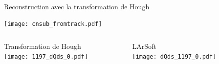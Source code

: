    \begin{frame}{Reconstruction avec la transformation de Hough}
        \begin{scriptsize}
            \begin{center} \texttt{[image: cnsub\_fromtrack.pdf]} \end{center}
            \begin{columns}
                \begin{column}{0.6\textwidth}
                    Transformation de Hough\\
                    \texttt{[image: 1197\_dQds\_0.pdf]}
                \end{column}
                \begin{column}{0.4\textwidth}
                    LArSoft\\
                    \texttt{[image: dQds\_1197\_0.pdf]}
                \end{column}
            \end{columns}
        \end{scriptsize}
    \end{frame}

